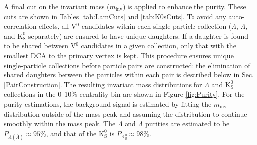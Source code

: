\documentclass[ALICE,manyauthors]{cernphprep}
\newcommand{\minv}{$m_{\mathrm{inv}}$\xspace}
\newcommand{\Lam}{$\Lambda$\xspace}
\newcommand{\ALam}{$\overline{\Lambda}$\xspace}
\newcommand{\Ks}{$\mathrm{K^{0}_{S}}$\xspace}
\newcommand{\Vz}{V$^{0}$\xspace}
\begin{document}
A final cut on the invariant mass (\minv) is applied to enhance the purity.
These cuts are shown in Tables \ref{tab:LamCuts} and \ref{tab:K0sCuts}.
To avoid any auto-correlation effects, all \Vz candidates within each single-particle collection (\Lam, \ALam, and \Ks separately) are ensured to have unique daughters. 
If a daughter is found to be shared between \Vz candidates in a given collection, only that with the smallest DCA to the primary vertex is kept.
This procedure ensures unique single-particle collections before particle pairs are constructed; the elimination of shared daughters between the particles within each pair is described below in Sec. \ref{PairConstruction}.
The resulting invariant mass distributions for \Lam and \Ks collections in the 0--10\% centrality bin are shown in Figure \ref{fig:Purity}.
For the purity estimations, the background signal is estimated by fitting the \minv distribution outside of the mass peak and assuming the distribution to continue smoothly within the mass peak.
The \Lam and \ALam purities are estimated to be $P_{\Lambda(\overline{\Lambda})} \approx 95\%$, and that of the \Ks is $P_{\mathrm{K^{0}_{S}}} \approx 98\%$.
\end{document}
